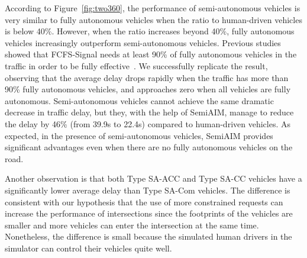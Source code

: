 According to Figure~\ref{fig:two360}, the performance of
semi-autonomous vehicles is very similar to fully autonomous vehicles
when the ratio to human-driven vehicles is below 40\%.  However, when
the ratio increases beyond 40\%, fully autonomous vehicles
increasingly outperform semi-autonomous vehicles.  Previous studies
showed that FCFS-Signal needs at least 90\% of fully autonomous
vehicles in the traffic in order to be fully
effective~\cite{bib:Dresner07Sharing}.  We successfully replicate the
result, observing that the average delay drops rapidly when the
traffic has more than 90\% fully autonomous vehicles, and approaches
zero when all vehicles are fully autonomous.  Semi-autonomous vehicles
cannot achieve the same dramatic decrease in traffic delay, but they,
with the help of SemiAIM, manage to reduce the delay by 46\% (from
39.9s to 22.4s) compared to human-driven vehicles.  As expected, in
the presence of semi-autonomous vehicles, SemiAIM provides significant
advantages even when there are no fully autonomous vehicles on the
road.

Another observation is that both Type SA-ACC and Type SA-CC vehicles
have a significantly lower average delay than Type SA-Com vehicles.
The difference is consistent with our hypothesis that the use of more
constrained requests can increase the performance of intersections
since the footprints of the vehicles are smaller and more vehicles can
enter the intersection at the same time.  Nonetheless, the difference
is small because the simulated human drivers in the simulator can
control their vehicles quite well.







